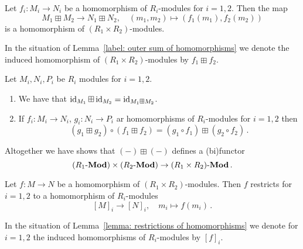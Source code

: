 \begin{lemma}
  \label{label: outer sum of homomorphisms}
  Let $f_i \colon M_i \to N_i$ be a homomorphism of $R_i$-modules for $i = 1, 2$.
  Then the map
  \[
            M_1 \boxplus M_2
    \to     N_1 \boxplus N_2,
    \quad   (m_1, m_2)
    \mapsto (f_1(m_1), f_2(m_2))
  \]
  is a homomorphism of $(R_1 \times R_2)$-modules.
\end{lemma}




\begin{definition}
  In the situation of Lemma~\ref{label: outer sum of homomorphisms} we denote the induced homomorphism of $(R_1 \times R_2)$-modules by $f_1 \boxplus f_2$.
\end{definition}


\begin{lemma}
  Let $M_i, N_i, P_i$ be $R_i$ modules for $i = 1, 2$.
  \begin{enumerate}
    \item
      We have that $\operatorname{id}_{M_1} \boxplus \operatorname{id}_{M_2} = \operatorname{id}_{M_1 \boxplus M_2}$.
    \item
      If $f_i \colon M_i \to N_i$, $g_i \colon N_i \to P_i$ ar homomorphisms of $R_i$-modules for $i = 1, 2$ then
      \[
          (g_1 \boxplus g_2) \circ (f_1 \boxplus f_2)
        = (g_1 \circ f_1) \boxplus (g_2 \circ f_2) \,.
      \]
  \end{enumerate}
\end{lemma}




\begin{remark}
  \label{remark: functor out of product}
  Altogether we have shows that $(-) \boxplus (-)$ defines a (bi)functor
  \[
        (R_1\text{-}\mathbf{Mod}) \times (R_2\text{-}\mathbf{Mod})
    \to (R_1 \times R_2)\text{-}\mathbf{Mod} \,.
  \]
\end{remark}


\begin{lemma}
  \label{lemma: restrictions of homomorphisms}
  Let $f \colon M \to N$ be a homomorphism of $(R_1 \times R_2)$-modules.
  Then $f$ restricts for $i = 1, 2$ to a homomorphism of $R_i$-modules
  \[
            [M]_i
    \to     [N]_i,
    \quad   m_i
    \mapsto f(m_i) \,.
  \]
\end{lemma}




\begin{definition}
  In the situation of Lemma~\ref{lemma: restrictions of homomorphisms} we denote for $i = 1, 2$ the induced homomorphisms of $R_i$-modules by $[f]_i$.
\end{definition}


